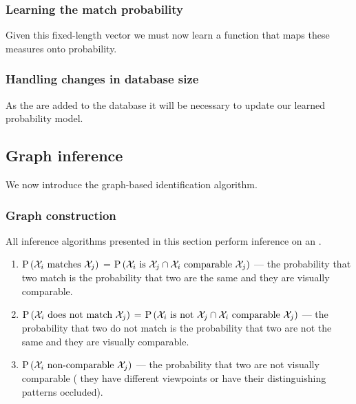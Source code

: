         \subsubsection{Learning the match probability}
            Given this fixed-length vector we must now learn a function that maps these measures onto probability.
            
        \subsubsection{Handling changes in database size}
            As the \annots{} are added to the database it will be necessary to update our learned probability model.
            
    \subsection{Graph inference}
        We now introduce the graph-based identification algorithm.
        
        \subsubsection{Graph construction}
            All inference algorithms presented in this section perform inference on an \glossterm{\idengraph{}}.
            
            \begin{enumerate}
                \item $\mathbin{\mathbin{\operatorname{P}}}\left(\mathcal{X}_{i}\textrm{ matches }\mathcal{X}_{j}\right)$ = $\mathbin{\mathbin{\operatorname{P}}}\left(\mathcal{X}_{i}\textrm{ is }\mathcal{X}_{j} \cap \mathcal{X}_{i}\textrm{ comparable }\mathcal{X}_{j}\right)$ --- the
                    probability that two \annot{} match is the probability that two \annots{} are the same and they
                      are visually comparable.
                    
                \item $\mathbin{\mathbin{\operatorname{P}}}\left(\mathcal{X}_{i}\textrm{ does not match }\mathcal{X}_{j}\right)$ = $\mathbin{\mathbin{\operatorname{P}}}\left(\mathcal{X}_{i}\textrm{ is not }\mathcal{X}_{j} \cap \mathcal{X}_{i}\textrm{ comparable }\mathcal{X}_{j}\right)$ ---
                    the probability that two \annots{} do not match is the probability that two \annots{} are not the
                      same and they are visually comparable.
                    
                \item $\mathbin{\mathbin{\operatorname{P}}}\left(\mathcal{X}_{i}\textrm{ non-comparable }\mathcal{X}_{j}\right)$ --- the probability that two \annots{}
                    are not visually comparable (\eg{} they have different viewpoints or have their distinguishing
                      patterns occluded).
            \end{enumerate}
            
